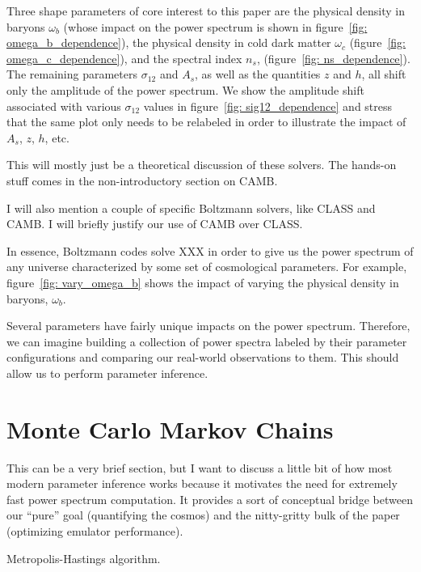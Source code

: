 
Three shape parameters of core interest to this paper are the physical density in baryons $\omega_b$ (whose impact on the power spectrum is shown in figure~\ref{fig: omega_b_dependence}), the physical density in cold dark matter $\omega_c$ (figure~\ref{fig: omega_c_dependence}), and the spectral index $n_s$, (figure~\ref{fig: ns_dependence}). The remaining parameters $\sigma_{12}$ and $A_s$, as well as the quantities $z$ and $h$, all shift only the amplitude of the power spectrum. We show the amplitude shift associated with various $\sigma_{12}$ values in figure~\ref{fig: sig12_dependence} and stress that the same plot only needs to be relabeled in order to illustrate the impact of $A_s$, $z$, $h$, etc. 


This will mostly just be a theoretical discussion of these solvers. The hands-on stuff comes in the non-introductory section on CAMB.

I will also mention a couple of specific Boltzmann solvers, like CLASS and CAMB. I will briefly justify our use of CAMB over CLASS.


In essence, Boltzmann codes solve XXX in order to give us the power spectrum
of any universe characterized by some set of cosmological parameters. For
example, figure~\ref{fig: vary_omega_b} shows the impact of varying the
physical density in baryons, $\omega_b$. 

Several parameters have fairly unique impacts on the power spectrum.
Therefore, we can imagine building a collection of power spectra labeled by
their parameter configurations and comparing our real-world observations to
them. This should allow us to perform parameter inference.

\section{Monte Carlo Markov Chains}

This can be a very brief section, but I want to discuss a little bit of how most modern parameter inference works because it motivates the need for extremely fast power spectrum computation. It provides a sort of conceptual bridge between our ``pure'' goal (quantifying the cosmos) and the nitty-gritty bulk of the paper (optimizing emulator performance).

Metropolis-Hastings algorithm.

